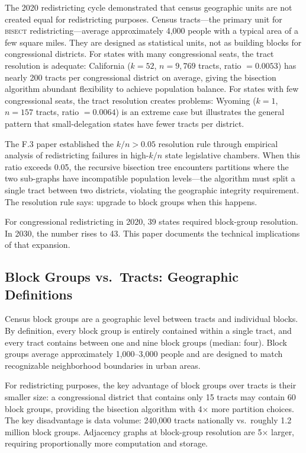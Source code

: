 \label{sec:introduction}

The 2020 redistricting cycle demonstrated that census geographic units are not
created equal for redistricting purposes. Census tracts---the primary unit for
\textsc{bisect} redistricting---average approximately 4{,}000 people with a typical
area of a few square miles. They are designed as statistical units, not as building
blocks for congressional districts. For states with many congressional seats, the
tract resolution is adequate: California ($k=52$, $n=9{,}769$ tracts, ratio $= 0.0053$)
has nearly 200 tracts per congressional district on average, giving the bisection
algorithm abundant flexibility to achieve population balance. For states with few
congressional seats, the tract resolution creates problems: Wyoming ($k=1$, $n=157$
tracts, ratio $= 0.0064$) is an extreme case but illustrates the general pattern
that small-delegation states have fewer tracts per district.

The F.3 paper \citep{f3paper} established the $k/n > 0.05$ resolution rule through
empirical analysis of redistricting failures in high-$k/n$ state legislative chambers.
When this ratio exceeds 0.05, the recursive bisection tree encounters partitions where
the two sub-graphs have incompatible population levels---the algorithm must split
a single tract between two districts, violating the geographic integrity requirement.
The resolution rule says: upgrade to block groups when this happens.

For congressional redistricting in 2020, 39 states required block-group resolution.
In 2030, the number rises to 43. This paper documents the technical implications
of that expansion.

\subsection{Block Groups vs.\ Tracts: Geographic Definitions}

Census block groups are a geographic level between tracts and individual blocks.
By definition, every block group is entirely contained within a single tract,
and every tract contains between one and nine block groups (median: four).
Block groups average approximately 1{,}000--3{,}000 people and are designed to
match recognizable neighborhood boundaries in urban areas.

For redistricting purposes, the key advantage of block groups over tracts is their
smaller size: a congressional district that contains only 15 tracts may contain
60 block groups, providing the bisection algorithm with 4$\times$ more partition
choices. The key disadvantage is data volume: 240{,}000 tracts nationally vs.\
roughly 1.2 million block groups. Adjacency graphs at block-group resolution are
5$\times$ larger, requiring proportionally more computation and storage.


